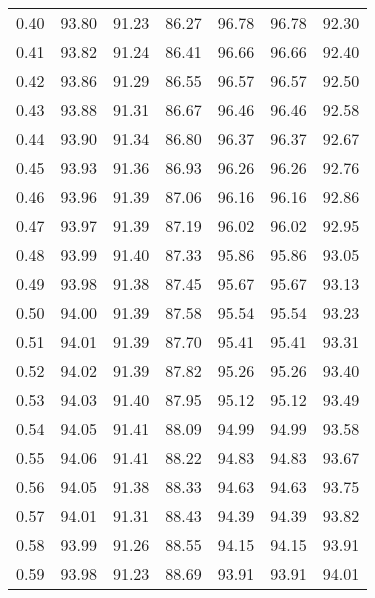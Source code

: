 \begin{tabular}{|c|c|c|c|c|c|c|}
      0.40 &     93.80 &     91.23 &      86.27 &   96.78 &      96.78 &         92.30 \\
      0.41 &     93.82 &     91.24 &      86.41 &   96.66 &      96.66 &         92.40 \\
      0.42 &     93.86 &     91.29 &      86.55 &   96.57 &      96.57 &         92.50 \\
      0.43 &     93.88 &     91.31 &      86.67 &   96.46 &      96.46 &         92.58 \\
      0.44 &     93.90 &     91.34 &      86.80 &   96.37 &      96.37 &         92.67 \\
      0.45 &     93.93 &     91.36 &      86.93 &   96.26 &      96.26 &         92.76 \\
      0.46 &     93.96 &     91.39 &      87.06 &   96.16 &      96.16 &         92.86 \\
      0.47 &     93.97 &     91.39 &      87.19 &   96.02 &      96.02 &         92.95 \\
      0.48 &     93.99 &     91.40 &      87.33 &   95.86 &      95.86 &         93.05 \\
      0.49 &     93.98 &     91.38 &      87.45 &   95.67 &      95.67 &         93.13 \\
      0.50 &     94.00 &     91.39 &      87.58 &   95.54 &      95.54 &         93.23 \\
      0.51 &     94.01 &     91.39 &      87.70 &   95.41 &      95.41 &         93.31 \\
      0.52 &     94.02 &     91.39 &      87.82 &   95.26 &      95.26 &         93.40 \\
      0.53 &     94.03 &     91.40 &      87.95 &   95.12 &      95.12 &         93.49 \\
      0.54 &     94.05 &     91.41 &      88.09 &   94.99 &      94.99 &         93.58 \\
      0.55 &     94.06 &     91.41 &      88.22 &   94.83 &      94.83 &         93.67 \\
      0.56 &     94.05 &     91.38 &      88.33 &   94.63 &      94.63 &         93.75 \\
      0.57 &     94.01 &     91.31 &      88.43 &   94.39 &      94.39 &         93.82 \\
      0.58 &     93.99 &     91.26 &      88.55 &   94.15 &      94.15 &         93.91 \\
      0.59 &     93.98 &     91.23 &      88.69 &   93.91 &      93.91 &         94.01 \\

\end{tabular}

